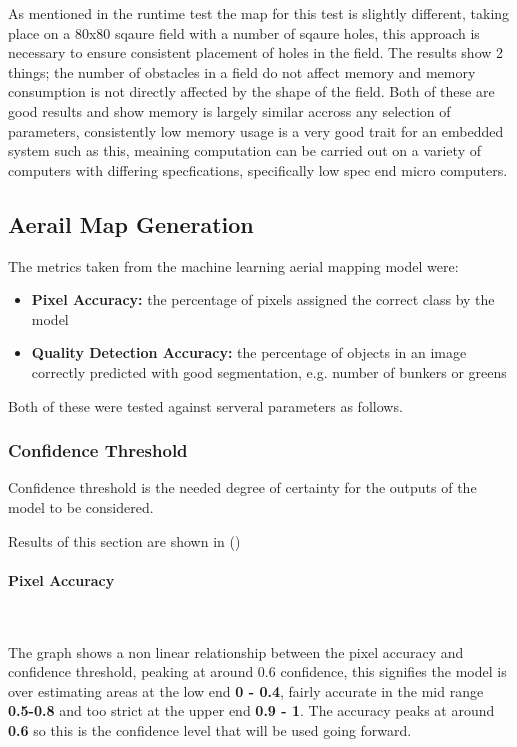 \documentclass[final]{cmpreport_02}
\begin{document}
As mentioned in the runtime test the map for this test is slightly different, taking place on a 80x80 sqaure field with a number of sqaure holes, this approach is necessary to ensure consistent placement of holes in the field.
The results show 2 things; the number of obstacles in a field do not affect memory and memory consumption is not directly affected by the shape of the field.
Both of these are good results and show memory is largely similar accross any selection of parameters, consistently low memory usage is a very good trait for an embedded system such as this, meaining computation can be carried out on a variety of computers with differing specfications, specifically low spec end micro computers.

\subsection{Aerail Map Generation}
The metrics taken from the machine learning aerial mapping model were:
\begin{itemize}
    \item{\textbf{Pixel Accuracy:} the percentage of pixels assigned the correct class by the model}
    \item{\textbf{Quality Detection Accuracy:} the percentage of objects in an image correctly predicted with good segmentation, e.g. number of bunkers or greens}
\end{itemize}
Both of these were tested against serveral parameters as follows.

\subsubsection{Confidence Threshold} \label{confidenceThresholdEval}

Confidence threshold is the needed degree of certainty for the outputs of the model to be considered.

Results of this section are shown in ()

\paragraph{Pixel Accuracy} \

The graph shows a non linear relationship between the pixel accuracy and confidence threshold, peaking at around 0.6 confidence, this signifies the model is over estimating areas at the low end \textbf{0 - 0.4}, fairly accurate in the mid range \textbf{0.5-0.8} and too strict at the upper end \textbf{0.9 - 1}.
The accuracy peaks at around \textbf{0.6} so this is the confidence level that will be used going forward.
\end{document}
